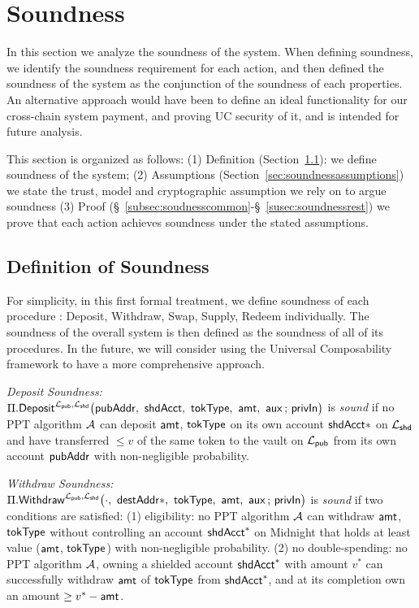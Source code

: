 \section{Soundness}
\label{sec:soundness}

In this section we analyze the soundness of the system.
When defining soundness, we identify the soundness requirement for each action, and then defined the soundness of the system as
the conjunction of the soundness of each properties.
An alternative approach would have been to define an ideal functionality for our cross-chain system payment, and proving UC security of it, and is intended for
future analysis.

This section is organized as follows: (1) Definition (Section~\ref{sec:soundnessdefinition}): we define soundness of the system; (2) Assumptions (Section~\ref{sec:soundnessassumptions}) we state the trust, model and cryptographic assumption we rely on to argue soundness (3) Proof (\S~\ref{subsec:soudnesscommon}-\S~\ref{susec:soundnessrest}) we prove that each action achieves soundness under the stated assumptions.


\subsection{Definition of Soundness}
\label{sec:soundnessdefinition}
For simplicity,  in this first formal treatment, we define soundness  of each procedure : Deposit, Withdraw, Swap, Supply, Redeem individually.
The soundness of the overall system is then defined as the soundness of all of its procedures.
In the future, we will consider using the Universal Composability framework to have a more comprehensive approach.


\begin{definition}
\label{def:depositss}
\emph{Deposit Soundness:} $\Pi.\Deposit^{\Lpub, \Lshd}\bigl(\pubAddr\bc \shdAcct\bc \tokType\bc \amt\bc
      \auxx \,;\, \privIn\bigr)$ is \emph{sound} if no PPT algorithm $\mathcal{A}$ can  deposit  $\mathsf{amt}$, $\mathsf{tokType}$ on its own account $\mathsf{shdAcct}*$ on $\mathcal{L}_{\mathsf{shd}}$  and have transferred $\leq v$ of the same token to the vault on $\mathcal{L}_{\mathsf{pub}}$ from its own account $\mathsf{pubAddr}$ with non-negligible probability.
 \end{definition}


\begin{definition}
\label{def:withdrawss}

\emph{Withdraw Soundness:} $\Pi.\Withdraw^{\Lpub, \Lshd}\bigl(\cdot\bc \destAddr*\bc \tokType\bc \amt\bc
      \auxx \,;\, \privIn\bigr)$ is \emph{sound} if
      two conditions are satisfied:
      (1) eligibility: no PPT algorithm $\mathcal{A}$ can  withdraw  $\mathsf{amt}$, $\mathsf{tokType}$ without controlling
      an account $\mathsf{shdAcct}^*$  on Midnight  that  holds at least value ($\mathsf{amt}$, $\mathsf{tokType}$) with non-negligible probability.
      (2) no double-spending: no PPT algorithm $\mathcal{A}$, owning a shielded account $\mathsf{shdAcct}^*$ with amount $v^*$  can successfully withdraw  $\mathsf{amt}$ of $\mathsf{tokType}$ from $\mathsf{shdAcct}^*$, and at its completion own
      an amount $\geq v^*- \mathsf{amt}$.


\end{definition}

